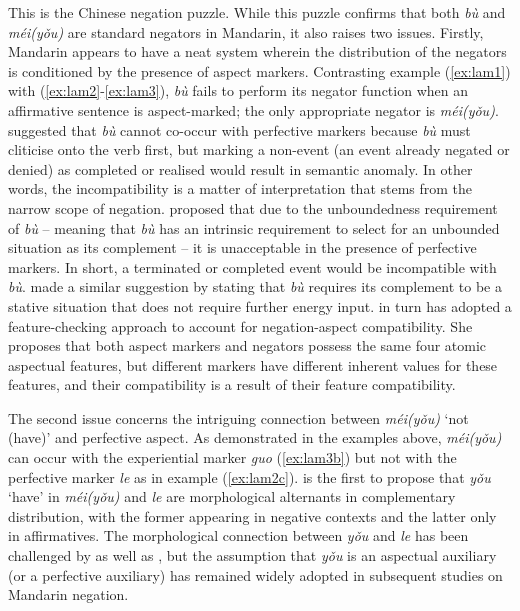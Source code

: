 \documentclass[output=paper]{langscibook}
\begin{document}
This is the Chinese negation puzzle. While this puzzle confirms that both \textit{bù} and \textit{méi(yǒu)} are standard negators in Mandarin, it also raises two issues. Firstly, Mandarin appears to have a neat system wherein the distribution of the negators is conditioned by the presence of aspect markers. Contrasting example (\ref{ex:lam1}) with (\ref{ex:lam2}-\ref{ex:lam3}), \textit{bù} fails to perform its negator function when an affirmative sentence is aspect-marked; the only appropriate negator is \textit{méi(yǒu)}. \cite{Huang1988} suggested that \textit{bù} cannot co-occur with perfective markers because \textit{bù} must cliticise onto the verb first, but marking a non-event (an event already negated or denied) as completed or realised would result in semantic anomaly. In other words, the incompatibility is a matter of interpretation that stems from the narrow scope of negation. \cite{Ernst1995} proposed that due to the unboundedness requirement of \textit{bù} – meaning that \textit{bù} has an intrinsic requirement to select for an unbounded situation as its complement – it is unacceptable in the presence of perfective markers. In short, a terminated or completed event would be incompatible with \textit{bù}. \cite{Lin2003} made a similar suggestion by stating that \textit{bù} requires its complement to be a stative situation that does not require further energy input. \cite{Li2007} in turn has adopted a feature-checking approach to account for negation-aspect compatibility. She proposes that both aspect markers and negators possess the same four atomic aspectual features, but different markers have different inherent values for these features, and their compatibility is a result of their feature compatibility. 

The second issue concerns the intriguing connection between \textit{méi(yǒu)} `not (have)' and perfective aspect. As demonstrated in the examples above, \textit{méi(yǒu)} can occur with the experiential marker \textit{guo} (\ref{ex:lam3b}) but not with the perfective marker \textit{le} as in example (\ref{ex:lam2c}). \cite{Wang1965} is the first to propose that \textit{yǒu} `have' in \textit{méi(yǒu)} and \textit{le} are morphological alternants in complementary distribution, with the former appearing in negative contexts and the latter only in affirmatives. The morphological connection between \textit{yǒu} and \textit{le} has been challenged by \citet[434--438]{LiThompson1981} as well as \cite{Li2007}, but the assumption that \textit{yǒu} is an aspectual auxiliary (or a perfective auxiliary) has remained widely adopted in subsequent studies on Mandarin negation.
\end{document}
